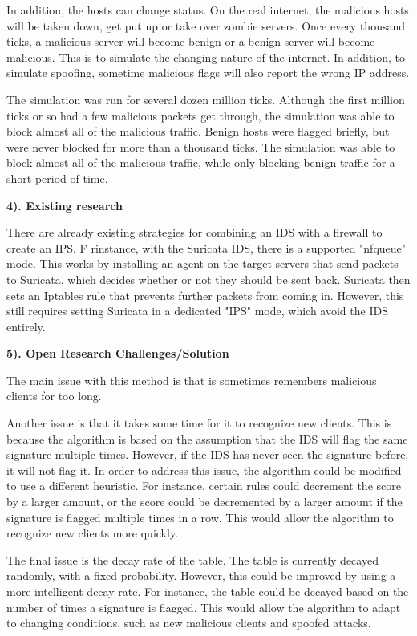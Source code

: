 \documentclass[12pt]{article}
\begin{document}
\begin{flushleft}
\begin{multicols}{2}
In addition, the hosts can change status. On the real internet, the malicious hosts will be taken down, get put up or take over zombie servers. Once every thousand ticks, a malicious server will become benign or a benign server will become malicious. This is to simulate the changing nature of the internet. In addition, to simulate spoofing, sometime malicious flags will also report the wrong IP address.

The simulation was run for several dozen million ticks. Although the first million ticks or so had a few malicious packets get through, the simulation was able to block almost all of the malicious traffic. Benign hosts were flagged briefly, but were never blocked for more than a thousand ticks. The simulation was able to block almost all of the malicious traffic, while only blocking benign traffic for a short period of time.

\textbf{4). Existing research}

There are already existing strategies for combining an IDS with a firewall to create an IPS. F rinstance, with the Suricata IDS, there is a supported "nfqueue" mode. This works by installing an agent on the target servers that send packets to Suricata, which decides whether or not they should be sent back. Suricata then sets an Iptables rule that prevents further packets from coming in. However, this still requires setting Suricata in a dedicated "IPS" mode, which avoid the IDS entirely.

\textbf{5). Open Research Challenges/Solution}

The main issue with this method is that is sometimes remembers malicious clients for too long.

Another issue is that it takes some time for it to recognize new clients. This is because the algorithm is based on the assumption that the IDS will flag the same signature multiple times. However, if the IDS has never seen the signature before, it will not flag it. In order to address this issue, the algorithm could be modified to use a different heuristic. For instance, certain rules could decrement the score by a larger amount, or the score could be decremented by a larger amount if the signature is flagged multiple times in a row. This would allow the algorithm to recognize new clients more quickly.

The final issue is the decay rate of the table. The table is currently decayed randomly, with a fixed probability. However, this could be improved by using a more intelligent decay rate. For instance, the table could be decayed based on the number of times a signature is flagged. This would allow the algorithm to adapt to changing conditions, such as new malicious clients and spoofed attacks.


\end{multicols}
\end{flushleft}
\end{document}
